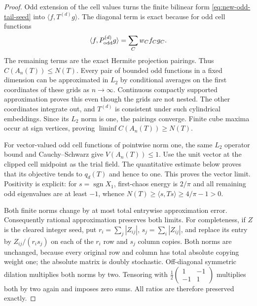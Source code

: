 \documentclass[11pt]{article}
\begin{document}
\begin{proof}
Odd extension of the cell values turns the finite bilinear form
\eqref{eq:new-odd-tail-seed} into $\langle f,T^{(d)}g\rangle$.
The diagonal term is exact because for odd cell functions
\[
 \langle f,P_{\rm odd}^{(d)}g\rangle
           =\sum_Cw_Cf_Cg_C.
\]
The remaining terms are the exact Hermite projection pairings.
Thus $C(A_n(T))\leq N(T)$.  Every pair of bounded odd functions in a
fixed dimension can be approximated in $L_2$ by conditional averages
on the first coordinates of these grids as $n\to\infty$.
Continuous compactly supported approximation proves this even though
the grids are not nested.  The other coordinates integrate out, and
$T^{(d)}$ is consistent under such cylindrical embeddings.  Since
its $L_2$ norm is one, the pairings converge.  Finite cube maxima
occur at sign vertices, proving $\liminf C(A_n(T))\geq N(T)$.

For vector-valued odd cell functions of pointwise norm one, the same
$L_2$ operator bound and Cauchy--Schwarz give $V(A_n(T))\leq1$.
Use the unit vector at the clipped cell midpoint as the trial field.
The quantitative estimate below proves that its objective tends to
$q_d(T)$ and hence to one.  This proves the vector limit.  Positivity
is explicit: for $s=\operatorname{sgn}X_1$, first-chaos energy is
$2/\pi$ and all remaining odd eigenvalues are at least $-1$, whence
$N(T)\geq\langle s,Ts\rangle\geq4/\pi-1>0$.

Both finite norms change by at most total entrywise approximation
error.  Consequently rational approximation preserves both limits.
For completeness, if $Z$ is the cleared integer seed, put
$r_i=\sum_j|Z_{ij}|$, $s_j=\sum_i|Z_{ij}|$, and replace its entry by
$Z_{ij}/(r_is_j)$ on each of the $r_i$ row and $s_j$ column copies.
Both norms are unchanged, because every original row and column has
total absolute copying weight one; the absolute matrix is doubly
stochastic.  Off-diagonal symmetric dilation multiplies both norms
by two.  Tensoring with
$\tfrac12\left(\begin{smallmatrix}1&-1\\-1&1\end{smallmatrix}\right)$
multiplies both by two again and imposes zero sums.  All ratios are
therefore preserved exactly.
\end{proof}
\end{document}
